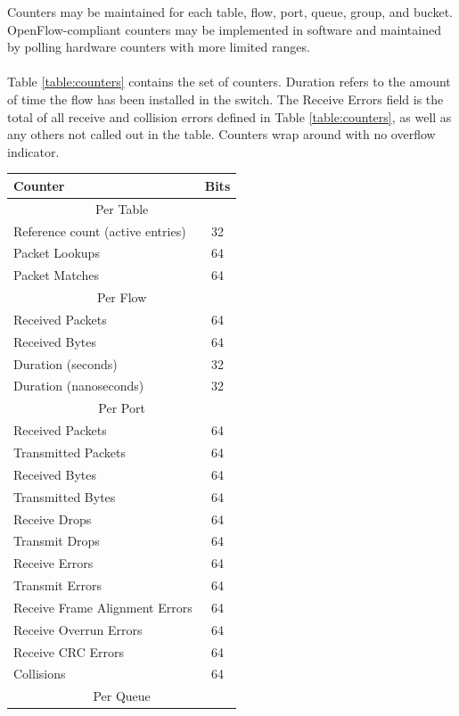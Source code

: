 \documentclass[10pt]{article}
\begin{document}
Counters may be maintained for each table, flow, port, queue, group, and bucket.  OpenFlow-compliant counters may be implemented in software and maintained by polling hardware counters with more limited ranges.
\\\\
Table \ref{table:counters} contains the set of counters.  Duration refers to the amount of time the flow has been installed in the switch.  The Receive Errors field is the total of all receive and collision errors defined in Table \ref{table:counters}, as well as any others not called out in the table.  Counters wrap around with no overflow indicator.
\begin{table}[!hbp]
\centering
\footnotesize
\begin{tabular}{ |l|c| }
\hline Counter & Bits	 \\
\hline \multicolumn{2}{|c|}{Per Table} \\
\hline Reference count (active entries) & 32 \\
\hline Packet Lookups & 64 \\
\hline Packet Matches & 64 \\
\hline \multicolumn{2}{|c|}{Per Flow} \\
\hline Received Packets & 64 \\
\hline Received Bytes & 64 \\
\hline Duration (seconds) & 32 \\
\hline Duration (nanoseconds) & 32 \\
\hline  \multicolumn{2}{|c|}{Per Port} \\
\hline Received Packets & 64 \\
\hline Transmitted Packets & 64 \\
\hline Received Bytes & 64 \\
\hline Transmitted Bytes & 64 \\
\hline Receive Drops & 64 \\
\hline Transmit Drops & 64 \\
\hline Receive Errors & 64 \\
\hline Transmit Errors & 64 \\
\hline Receive Frame Alignment Errors & 64 \\
\hline Receive Overrun Errors & 64 \\
\hline Receive CRC Errors & 64 \\
\hline Collisions & 64 \\
\hline  \multicolumn{2}{|c|}{Per Queue} \\

\end{tabular}
\end{table}
\end{document}
